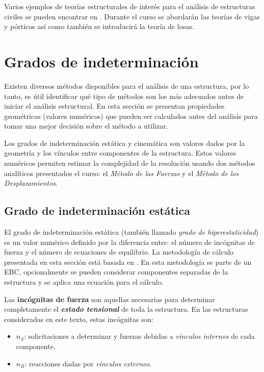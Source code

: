 Varios ejemplos de teorías estructurales de interés para el análisis de estructuras civiles se pueden encontrar en \citep{Onate2013}. %
%
Durante el curso se abordarán las teorías de vigas y pórticos así como también se introducirá la teoría de losas.



\section{Grados de indeterminación}

Existen diversos métodos disponibles para el análisis de una estructura, por lo tanto, es útil identificar qué tipo de métodos son los más adecuados antes de iniciar el análisis estructural. %
En esta sección se presentan propiedades geométricas (valores numéricos) que pueden ser calculados antes del análisis para tomar una mejor decisión sobre el método a utilizar.

Los grados de indeterminación estática y cinemática son valores dados por la geometría y los vínculos entre componentes de la estructura. %
%
Estos valores numéricos permiten estimar la complejidad de la resolución usando dos métodos analíticos presentados el curso: el \textit{Método de las Fuerzas} y el \textit{Método de los Desplazamientos}. %
%


\subsection{Grado de indeterminación estática}

El grado de indeterminación estática (también llamado \textit{grado de hiperestaticidad}) es un valor numérico definido por la diferencia entre: el número de incógnitas de fuerza y el número de ecuaciones de equilibrio. %
%
La metodología de cálculo presentada en esta sección está basada en \citep{CerveraRuiz2002ii}. %
%
En esta metodología se parte de un EBC, opcionalmente se pueden considerar componentes separadas de la estructura y se aplica una ecuación para el cálculo.

Las \textbf{incógnitas de fuerza} son aquellas necesarias para determinar completamente el \textit{\textbf{estado tensional}} de toda la estructura. En las estructuras consideradas en este texto, estas incógnitas son:
%
\begin{itemize}
	\item $n_S$: solicitaciones a determinar y fuerzas debidas a \textit{vínculos internos} de cada componente,
	\item $n_R$: reacciones dadas por \textit{vínculos externos}.
\end{itemize}


